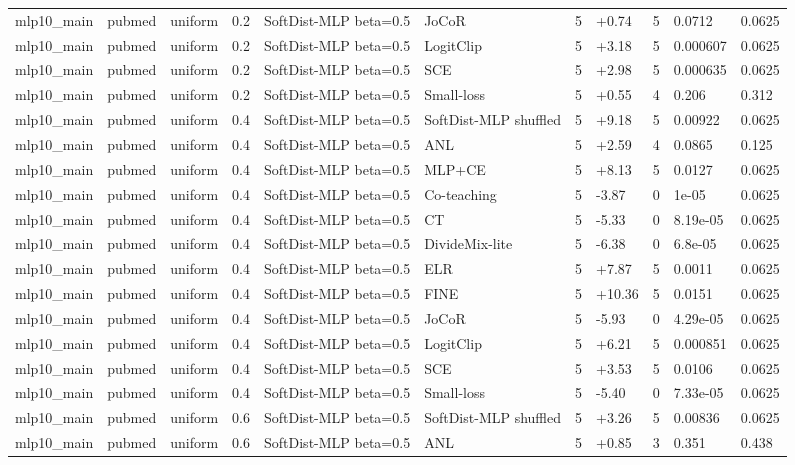 \begin{table}[t]
\begin{tabular}{llllllrlrll}
mlp10_main & pubmed & uniform & 0.2 & SoftDist-MLP beta=0.5 & JoCoR & 5 & +0.74 & 5 & 0.0712 & 0.0625 \\
mlp10_main & pubmed & uniform & 0.2 & SoftDist-MLP beta=0.5 & LogitClip & 5 & +3.18 & 5 & 0.000607 & 0.0625 \\
mlp10_main & pubmed & uniform & 0.2 & SoftDist-MLP beta=0.5 & SCE & 5 & +2.98 & 5 & 0.000635 & 0.0625 \\
mlp10_main & pubmed & uniform & 0.2 & SoftDist-MLP beta=0.5 & Small-loss & 5 & +0.55 & 4 & 0.206 & 0.312 \\
mlp10_main & pubmed & uniform & 0.4 & SoftDist-MLP beta=0.5 & SoftDist-MLP shuffled & 5 & +9.18 & 5 & 0.00922 & 0.0625 \\
mlp10_main & pubmed & uniform & 0.4 & SoftDist-MLP beta=0.5 & ANL & 5 & +2.59 & 4 & 0.0865 & 0.125 \\
mlp10_main & pubmed & uniform & 0.4 & SoftDist-MLP beta=0.5 & MLP+CE & 5 & +8.13 & 5 & 0.0127 & 0.0625 \\
mlp10_main & pubmed & uniform & 0.4 & SoftDist-MLP beta=0.5 & Co-teaching & 5 & -3.87 & 0 & 1e-05 & 0.0625 \\
mlp10_main & pubmed & uniform & 0.4 & SoftDist-MLP beta=0.5 & CT & 5 & -5.33 & 0 & 8.19e-05 & 0.0625 \\
mlp10_main & pubmed & uniform & 0.4 & SoftDist-MLP beta=0.5 & DivideMix-lite & 5 & -6.38 & 0 & 6.8e-05 & 0.0625 \\
mlp10_main & pubmed & uniform & 0.4 & SoftDist-MLP beta=0.5 & ELR & 5 & +7.87 & 5 & 0.0011 & 0.0625 \\
mlp10_main & pubmed & uniform & 0.4 & SoftDist-MLP beta=0.5 & FINE & 5 & +10.36 & 5 & 0.0151 & 0.0625 \\
mlp10_main & pubmed & uniform & 0.4 & SoftDist-MLP beta=0.5 & JoCoR & 5 & -5.93 & 0 & 4.29e-05 & 0.0625 \\
mlp10_main & pubmed & uniform & 0.4 & SoftDist-MLP beta=0.5 & LogitClip & 5 & +6.21 & 5 & 0.000851 & 0.0625 \\
mlp10_main & pubmed & uniform & 0.4 & SoftDist-MLP beta=0.5 & SCE & 5 & +3.53 & 5 & 0.0106 & 0.0625 \\
mlp10_main & pubmed & uniform & 0.4 & SoftDist-MLP beta=0.5 & Small-loss & 5 & -5.40 & 0 & 7.33e-05 & 0.0625 \\
mlp10_main & pubmed & uniform & 0.6 & SoftDist-MLP beta=0.5 & SoftDist-MLP shuffled & 5 & +3.26 & 5 & 0.00836 & 0.0625 \\
mlp10_main & pubmed & uniform & 0.6 & SoftDist-MLP beta=0.5 & ANL & 5 & +0.85 & 3 & 0.351 & 0.438 \\

\end{tabular}
\end{table}
